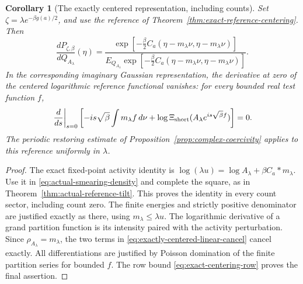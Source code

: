 \documentclass[11pt]{article}
\newtheorem{corollary}[theorem]{Corollary}
\theoremstyle{remark}\newtheorem{remark}[theorem]{Remark}
\begin{document}
\begin{corollary}[The exactly centered representation, including counts]
\label{cor:exactly-centered-representation}
Set $\zeta=\lambda e^{-\beta g(a)/2}$, and use the reference of
Theorem~\ref{thm:exact-reference-centering}.  Then
\begin{equation}\label{eq:exactly-centered-tilt}
 \frac{dP_{\zeta,\beta}}{dQ_{A_\lambda}}(\eta)
 =\frac{\exp[-\frac\beta2 C_a(\eta-m_\lambda\nu,
                                  \eta-m_\lambda\nu)]}
 {E_{Q_{A_\lambda}}\exp[-\frac\beta2 C_a(\eta-m_\lambda\nu,
                                  \eta-m_\lambda\nu)]}.
\end{equation}
In the corresponding imaginary Gaussian representation, the derivative
at zero of the centered logarithmic reference functional vanishes:
for every bounded real test function $f$,
\begin{equation}\label{eq:exactly-centered-linear-cancel}
 \left.\frac d{ds}\right|_{s=0}
 \left[-is\sqrt\beta\int m_\lambda f\,d\nu
  +\log\Xi_{\rm short}(A_\lambda e^{is\sqrt\beta f})\right]=0.
\end{equation}
The periodic restoring estimate of
Proposition~\ref{prop:complex-coercivity} applies to this reference
uniformly in $\lambda$.
\end{corollary}
\begin{proof}
The exact fixed-point activity identity is
$\log(\lambda u)=\log A_\lambda+\beta C_a*m_\lambda$.
Use it in \eqref{eq:actual-smearing-density} and complete the square,
as in Theorem~\ref{thm:actual-reference-tilt}.  This proves the identity
in every count sector, including count zero.  The finite energies and
strictly positive denominator are justified exactly as there, using
$m_\lambda\le\lambda u$.  The logarithmic derivative of a grand
partition function is its intensity paired with the activity
perturbation.  Since $\rho_{A_\lambda}=m_\lambda$, the two terms
in \eqref{eq:exactly-centered-linear-cancel} cancel exactly.
All differentiations are justified by Poisson domination of the
finite partition series for bounded $f$.  The row bound
\eqref{eq:exact-centering-row} proves the final assertion.
\end{proof}
\end{document}
